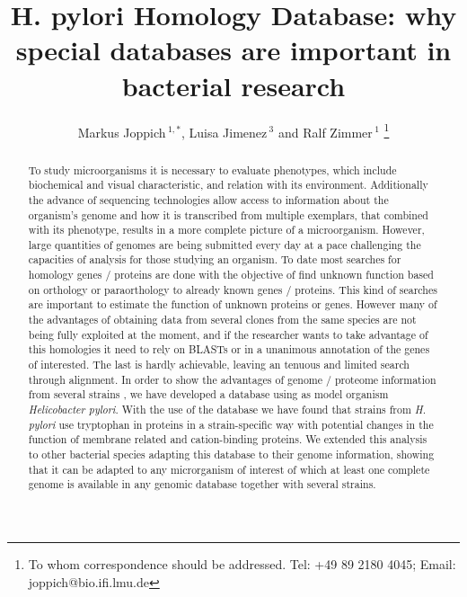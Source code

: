 \documentclass[a4,center,fleqn]{NAR}
\begin{document}
\title{H. pylori Homology Database: why special databases are important in bacterial research}

\author{%
Markus Joppich\,$^{1,*}$,
Luisa Jimenez\,$^{3}$
and Ralf Zimmer\,$^1$%
\footnote{To whom correspondence should be addressed.
Tel: +49 89 2180 4045; Email: joppich@bio.ifi.lmu.de}}

\address{%
$^{1}$Affiliation of Corresponding Author
and
$^{2}$Affiliation of Both Co-Authors}


\maketitle

\begin{abstract}
	To study microorganisms it is necessary to evaluate phenotypes, which include biochemical and visual characteristic, and relation with its environment.
	Additionally the advance of sequencing technologies allow access to information about the organism's genome and how it is transcribed from multiple exemplars, that combined with its phenotype, results in a more complete picture of a microorganism.
	However, large quantities of genomes are being submitted every day at a pace challenging the capacities of analysis for those studying an organism.
	To date most searches for homology genes / proteins are done with the objective of find unknown function based on orthology or paraorthology to already known genes / proteins.
	This kind of searches are important to estimate the function of unknown proteins or genes. However many of the advantages of obtaining data from several clones from the same species are not being fully exploited at the moment, and if the researcher wants to take advantage of this homologies it need to rely on BLASTs or in a unanimous annotation of the genes of interested. The last is hardly achievable, leaving an tenuous and limited search through alignment.
	In order to show the advantages of genome / proteome information from several strains , we have developed a database using as model organism \textit {Helicobacter pylori}.
	With the use of the database we have found that strains from \textit{H. pylori} use tryptophan in proteins in a strain-specific way with potential changes in the function of membrane related and cation-binding proteins.
	We extended this analysis to other bacterial species adapting this database to their genome information, showing that it can be adapted to any microrganism of interest of which at least one complete genome is available in any genomic database together with several strains.
\end{abstract}
\end{document}
